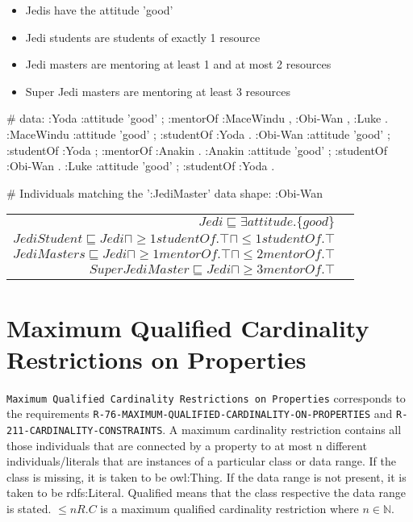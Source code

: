 \documentclass{llncs}
\newcommand{\ms}[1]{\texttt{#1}}
\newenvironment{DL}{
  \vspace{0cm}
	\begin{center}
  \begin{tabular}{r l}

}{
  \end{tabular}
	\end{center}
}
\begin{document}
\begin{itemize}
	\item Jedis have the attitude 'good'
	\item Jedi students are students of exactly 1 resource
	\item Jedi masters are mentoring at least 1 and at most 2 resources
	\item Super Jedi masters are mentoring at least 3 resources  
\end{itemize}
\begin{ex}
# data:
:Yoda 
    :attitude 'good' ;
    :mentorOf :MaceWindu , :Obi-Wan , :Luke .
:MaceWindu
    :attitude 'good' ;
    :studentOf :Yoda .
:Obi-Wan 
    :attitude 'good' ;
    :studentOf :Yoda ;
    :mentorOf :Anakin .
:Anakin
    :attitude 'good' ; 
    :studentOf :Obi-Wan .
:Luke
    :attitude 'good' ;
    :studentOf :Yoda .
\end{ex}

\begin{ex}
# Individuals matching the ’:JediMaster’ data shape:
:Obi-Wan
\end{ex}

\begin{DL}
$Jedi \sqsubseteq \exists attitude.\{good\} $\\
$JediStudent \sqsubseteq Jedi \sqcap \geq1 studentOf.\top \sqcap \leq1 studentOf.\top$ \\
$JediMasters \sqsubseteq Jedi \sqcap \geq1 mentorOf.\top \sqcap \leq2 mentorOf.\top $\\
$SuperJediMaster \sqsubseteq Jedi \sqcap  \geq3 mentorOf.\top $
\end{DL}

\section{Maximum Qualified Cardinality Restrictions on Properties}

\ms{Maximum Qualified Cardinality Restrictions on Properties} corresponds to the requirements
\ms{R-76-MAXIMUM-QUALIFIED-CARDINALITY-ON-PROPERTIES} and
\ms{R-211-CARDINALITY-CONSTRAINTS}.
A maximum cardinality restriction contains all those individuals that are connected by a property to at most n different individuals/literals that are instances of a particular class or data range. If the class is missing, it is taken to be owl:Thing. If the data range is not present, it is taken to be rdfs:Literal.
Qualified means that the class respective the data range is stated. 
$\leq n R. C$ is a maximum qualified cardinality restriction where $n \in \mathbb{N}$.
\end{document}
